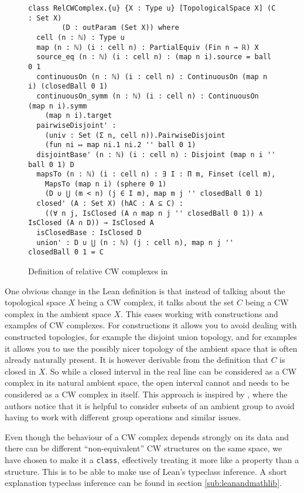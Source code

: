 \begin{figure}
\caption{Definition of relative CW complexes in \mathlib}
\label{fig:def}
\begin{lstlisting}[frame=single]
    class RelCWComplex.{u} {X : Type u} [TopologicalSpace X] (C : Set X) 
        (D : outParam (Set X)) where
  cell (n : ℕ) : Type u
  map (n : ℕ) (i : cell n) : PartialEquiv (Fin n → ℝ) X
  source_eq (n : ℕ) (i : cell n) : (map n i).source = ball 0 1
  continuousOn (n : ℕ) (i : cell n) : ContinuousOn (map n i) (closedBall 0 1)
  continuousOn_symm (n : ℕ) (i : cell n) : ContinuousOn (map n i).symm 
    (map n i).target
  pairwiseDisjoint' :
    (univ : Set (Σ n, cell n)).PairwiseDisjoint 
    (fun ni ↦ map ni.1 ni.2 '' ball 0 1)
  disjointBase' (n : ℕ) (i : cell n) : Disjoint (map n i '' ball 0 1) D
  mapsTo (n : ℕ) (i : cell n) : ∃ I : Π m, Finset (cell m),
    MapsTo (map n i) (sphere 0 1) 
    (D ∪ ⋃ (m < n) (j ∈ I m), map m j '' closedBall 0 1)
  closed' (A : Set X) (hAC : A ⊆ C) :
    ((∀ n j, IsClosed (A ∩ map n j '' closedBall 0 1)) ∧ IsClosed (A ∩ D)) → IsClosed A
  isClosedBase : IsClosed D
  union' : D ∪ ⋃ (n : ℕ) (j : cell n), map n j '' closedBall 0 1 = C
\end{lstlisting}
\end{figure}

One obvious change in the Lean definition is that instead of talking about the topological space $X$ being a CW complex, it talks about the set $C$ being a CW complex in the ambient space $X$.
This eases working with constructions and examples of CW complexes. 
For constructions it allows you to avoid dealing with constructed topologies, for example the disjoint union topology, and for examples it allows you to use the possibly nicer topology of the ambient space that is often already naturally present. 
It is however derivable from the definition that $C$ is closed in $X$. 
So while a closed interval in the real line can be considered as a CW complex in its natural ambient space, the open interval cannot and needs to be considered as a CW complex in itself. 
This approach is inspired by \cite{Gonthier2013}, where the authors notice that it is helpful to consider subsets of an ambient group to avoid having to work with different group operations and similar issues.

Even though the behaviour of a CW complex depends strongly on its data and there can be different ``non-equivalent'' CW structures on the same space, we have chosen to make it a \lstinline|class|, effectively treating it more like a property than a structure. 
This is to be able to make use of Lean's typeclass inference.
A short explanation typeclass inference can be found in section \ref{sub:leanandmathlib}.

